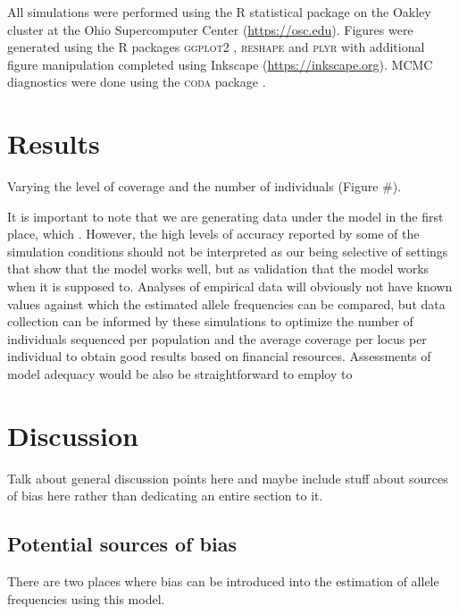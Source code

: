 \documentclass[11pt,english,letterpaper,oneside]{article}
\begin{document}
All simulations were performed using the R statistical package \citep{r2014} on the Oakley cluster at the Ohio Supercomputer Center (\url{https://osc.edu}). Figures were generated using the R packages \textsc{ggplot2} \citep{wickham2009ggplot2}, \textsc{reshape} \citep{wickham2011plyr} and \textsc{plyr} \citep{wickham2007reshape} with additional figure manipulation completed using Inkscape (\url{https://inkscape.org}). MCMC diagnostics were done using the \textsc{coda} package \citep{plummer2006coda}.
\medskip

\section*{Results}         %

Varying the level of coverage and the number of individuals (Figure \#).
\medskip

It is important to note that we are generating data under the model in the first place, which . However, the high levels of accuracy reported by some of the simulation conditions should not be interpreted as our being selective of settings that show that the model works well, but as validation that the model works when it is supposed to. Analyses of empirical data will obviously not have known values against which the estimated allele frequencies can be compared, but data collection can be informed by these simulations to optimize the number of individuals sequenced per population and the average coverage per locus per individual to obtain good results based on financial resources. Assessments of model adequacy would be also be straightforward to employ to 
\medskip

\section*{Discussion}         %

Talk about general discussion points here and maybe include stuff about sources of bias here rather than dedicating an entire section to it.

\medskip
\subsection*{Potential sources of bias}
\medskip

There are two places where bias can be introduced into the estimation of allele frequencies using this model.
\medskip
\end{document}
